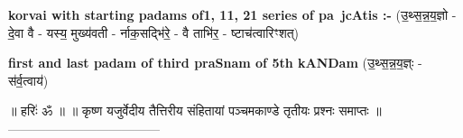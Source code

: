 \documentclass[17pt]{extarticle}
\begin{document}
        \textbf{korvai with starting padams of1, 11, 21 series of pa~jcAtis :-} \newline
        (उ॒थ्स॒न्न॒य॒ज्ञो - दे॒वा वै - यस्य॒ मुख्य॑वती - र्नाक॒सद्भि॑रे॒ - वै ताभि॑र॒ - ष्टाच॑त्वारिꣳशत्) \newline

        \textbf{first and last padam of third praSnam of 5th kANDam} \newline
        (उ॒थ्स॒न्न॒य॒ज्ञ्ः - स॑र्व॒त्वाय॑) \newline 

        
        ॥ हरिः॑ ॐ ॥
॥ कृष्ण यजुर्वेदीय तैत्तिरीय संहितायां पञ्चमकाण्डे तृतीयः प्रश्नः समाप्तः ॥
------------------------------------ \newline
        \pagebreak
                \pagebreak
        
\end{document}
